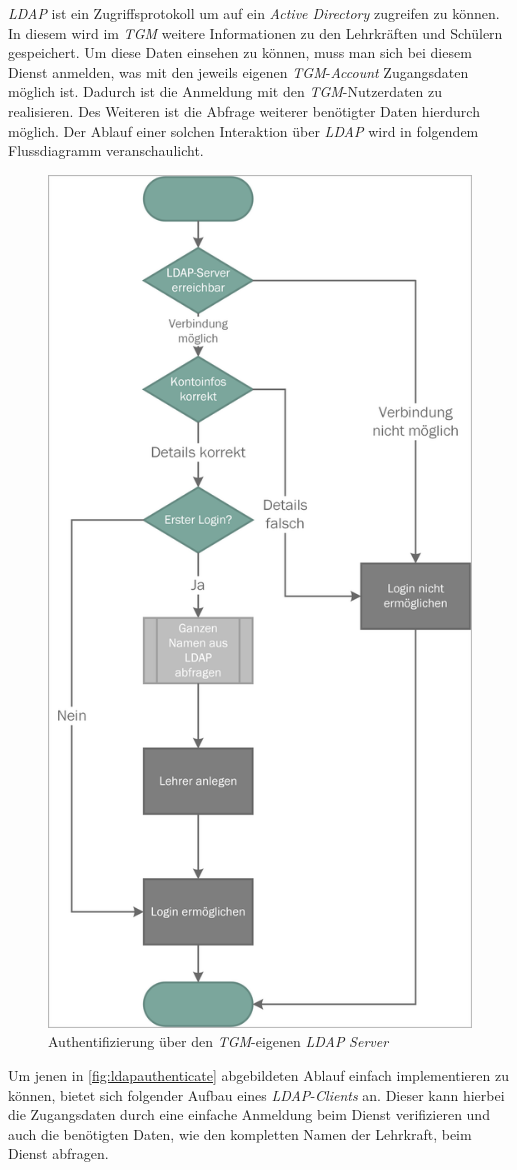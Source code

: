 \textit{LDAP} ist ein Zugriffsprotokoll um auf ein \textit{Active Directory} zugreifen zu können. In diesem wird im \textit{TGM} weitere Informationen zu den Lehrkräften und Schülern gespeichert. Um diese Daten einsehen zu können, muss man sich bei diesem Dienst anmelden, was mit den jeweils eigenen \textit{TGM}-\textit{Account} Zugangsdaten möglich ist. Dadurch ist die Anmeldung mit den \textit{TGM}-Nutzerdaten zu realisieren. Des Weiteren ist die Abfrage weiterer benötigter Daten hierdurch möglich. Der Ablauf einer solchen Interaktion über \textit{LDAP} wird in folgendem Flussdiagramm veranschaulicht.

\begin{figure}[H]
	\centering
	\includegraphics[width=0.5\linewidth]{images/mbeier_konzept/LDAP_border}
	\caption[Authentifizierung über \textit{LDAP}]{Authentifizierung über den \textit{TGM}-eigenen \textit{LDAP} \textit{Server}}
	\label{fig:ldapauthenticate}
\end{figure}

\newpage

Um jenen in \autoref{fig:ldapauthenticate} abgebildeten Ablauf einfach implementieren zu können, bietet sich folgender Aufbau eines \textit{LDAP}-\textit{Clients} an. Dieser kann hierbei die Zugangsdaten durch eine einfache Anmeldung beim Dienst verifizieren und auch die benötigten Daten, wie den kompletten Namen der Lehrkraft, beim Dienst abfragen.

